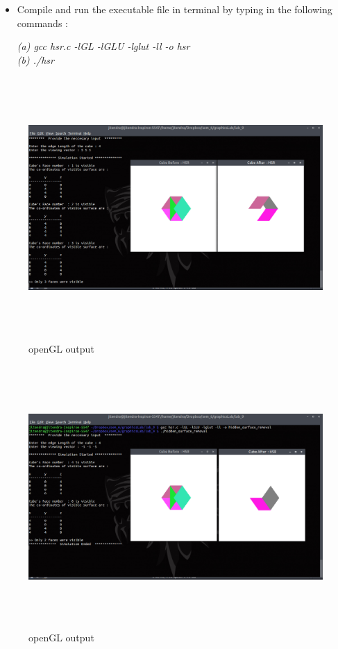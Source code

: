 \begin{itemize}
\begin{lstlisting}
\end{lstlisting}

\vspace{0.5mm}

\item Compile and run the executable file in terminal by typing in the following commands : \\

\vspace{0.5mm} \flushleft

\textit{(a)\hspace{2mm} gcc hsr.c -lGL -lGLU -lglut -ll -o hsr} \\
\textit{(b)\hspace{2mm} ./hsr}
\vspace*{1\baselineskip}
\end{itemize}

\begin{figure}[ht!]
\centering
\includegraphics[width=150mm, height=100mm]{output1.png}
\caption{openGL output \label{overflow}}
\end{figure}
\begin{figure}[ht!]
\centering
\includegraphics[width=150mm, height=100mm]{output2.png}
\caption{openGL output \label{overflow}}
\end{figure}

